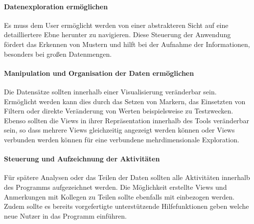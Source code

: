 \documentclass[draft=false
              ,paper=a4
              ,twoside=false
              ,fontsize=11pt
              ,headsepline
              ,BCOR10mm
              ,DIV11
              ]{scrbook}
\begin{document}
\paragraph{Datenexploration ermöglichen} %
\label{par:datenexploration_ermöglichen}
Es muss dem User ermöglicht werden von einer abstrakteren Sicht auf eine detailliertere Ebne herunter zu navigieren. Diese Steuerung der Anwendung fördert das Erkennen von Mustern und hilft bei der Aufnahme der Informationen, besonders bei großen Datenmengen.

\paragraph{Manipulation und Organisation der Daten ermöglichen} %
\label{par:manipulation_der_daten_ermöglichen}
Die Datensätze sollten innerhalb einer Visualisierung veränderbar sein. Ermöglicht werden kann dies durch das Setzen von Markern, das Einsetzten von Filtern oder direkte Veränderung von Werten beispielsweise zu Testzwecken. Ebenso sollten die Views in ihrer Repräsentation innerhalb des Tools veränderbar sein, so dass mehrere Views gleichzeitig angezeigt werden können oder Views verbunden werden können für eine verbundene mehrdimensionale Exploration.
\paragraph{Steuerung und Aufzeichnung der Aktivitäten} %
\label{par:aufzeichnung_der_aktivitäten}
Für spätere Analysen oder das Teilen der Daten sollten alle Aktivitäten innerhalb des Programms aufgezeichnet werden. Die Möglichkeit erstellte Views und Anmerkungen mit Kollegen zu Teilen sollte ebenfalls mit einbezogen werden. Zudem sollte es bereits vorgefertigte unterstützende Hilfefunktionen geben welche neue Nutzer in das Programm einführen.
\end{document}
